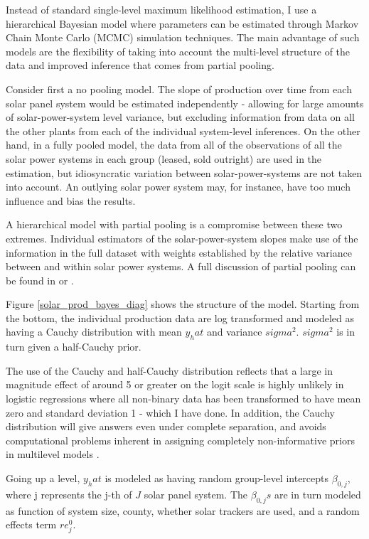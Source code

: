 \documentclass[12pt]{article}
\begin{document}
Instead of standard single-level maximum likelihood estimation,  I use a hierarchical Bayesian model where parameters can be estimated through Markov Chain Monte Carlo (MCMC) simulation techniques. The main advantage of such models are the flexibility of taking into account the multi-level structure of the data and improved inference that comes from partial pooling. 

Consider first a no pooling model. The slope of production over time from each solar panel system would be estimated independently - allowing for large amounts of solar-power-system level variance, but excluding information from data on all the other plants from each of the individual system-level inferences. On the other hand, in a fully pooled model, the data from all of the observations of all the solar power systems in each group (leased, sold outright) are used in the estimation, but idiosyncratic variation between solar-power-systems are not taken into account. An outlying solar power system may, for instance, have too much influence and bias the results.

A hierarchical model with partial pooling is a compromise between these two extremes. Individual estimators of the solar-power-system slopes make use of the information in the full dataset with weights established by the relative variance between and within solar power systems. A full discussion of partial pooling can be found in \citet{gelman_bayesian_2013} or \citet{kruschke_doing_2014}.


Figure \ref{solar_prod_bayes_diag} shows the structure of the model. Starting from the bottom, the individual production data are log transformed and modeled as having a Cauchy distribution with mean $y_hat$ and variance $sigma^2$. $sigma^2$ is in turn given a half-Cauchy prior. 

The use of the Cauchy and half-Cauchy distribution reflects that a large in magnitude effect of around 5 or greater on the logit scale is highly unlikely in logistic regressions where all non-binary data has been transformed to have mean zero and standard deviation 1 - which I have done. In addition, the Cauchy distribution will give answers even under complete separation, and avoids computational problems inherent in assigning completely non-informative priors in multilevel models \citep{gelman_weakly_2008}.

Going up a level, $y_hat$ is modeled as having random group-level intercepts $\beta_{0,j}$, where j represents the j-th of $J$ solar panel system. The $\beta_{0,j}s$ are in turn modeled as function of system size, county, whether solar trackers are used, and a random effects term $re_j^0$. 
\end{document}
